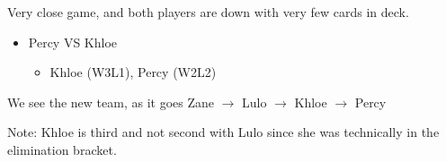 \par \noindent Very close game, and both players are down with very few cards in deck.

\begin{itemize}
   \item Percy VS Khloe
   \begin{itemize}
      \item Khloe (W3L1), Percy (W2L2)
   \end{itemize}
\end{itemize}
        
\par We see the new team, as it goes Zane $\rightarrow$ Lulo $\rightarrow$ Khloe $\rightarrow$ Percy

\par Note: Khloe is third and not second with Lulo since she was technically in the elimination bracket.